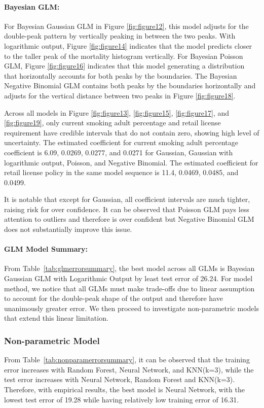 \documentclass{article}
\begin{document}
\paragraph{Bayesian GLM:}
For Bayesian Gaussian GLM in Figure \ref{fig:figure12}, this model adjusts for the double-peak pattern by vertically peaking in between the two peaks. With logarithmic output, Figure \ref{fig:figure14} indicates that the model predicts closer to the taller peak of the mortality histogram vertically. For Bayesian Poisson GLM, Figure \ref{fig:figure16} indicates that this model generating a distribution that horizontally accounts for both peaks by the boundaries. The Bayesian Negative Binomial GLM contains both peaks by the boundaries horizontally and adjusts for the vertical distance between two peaks in Figure \ref{fig:figure18}.

Across all models in Figure \ref{fig:figure13}, \ref{fig:figure15}, \ref{fig:figure17}, and \ref{fig:figure19}, only current smoking adult percentage and retail license requirement have credible intervals that do not contain zero, showing high level of uncertainty. The estimated coefficient for current smoking adult percentage coefficient is 6.09, 0.0269, 0.0277, and 0.0271 for Gaussian, Gaussian with logarithmic output, Poisson, and Negative Binomial. The estimated coefficient for retail license policy in the same model sequence is 11.4, 0.0469, 0.0485, and 0.0499. 

It is notable that except for Gaussian, all coefficient intervals are much tighter, raising risk for over confidence. It can be observed that Poisson GLM pays less attention to outliers and therefore is over confident but Negative Binomial GLM does not substantially improve this issue. 

\paragraph{GLM Model Summary:}
From Table~\ref{tab:glmerrorsummary}, the best model across all GLMs is Bayesian Gaussian GLM with Logarithmic Output by least test error of 26.24.  
For model method, we notice that all GLMs must make trade-offs due to linear assumption to account for the double-peak shape of the output and therefore have unanimously greater error. We then proceed to investigate non-parametric models that extend this linear limitation. 

\subsubsection{Non-parametric Model}
From Table~\ref{tab:nonparamerrorsummary}, it can be observed that the training error increases with Random Forest, Neural Network, and KNN(k=3), while the test error increases with Neural Network, Random Forest and KNN(k=3). Therefore, with empirical results, the best model is Neural Network, with the lowest test error of 19.28 while having relatively low training error of 16.31. 
\end{document}
